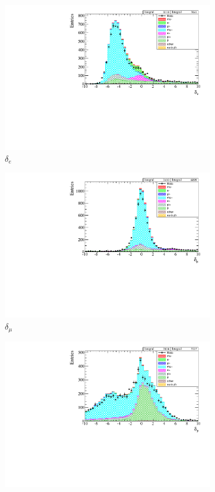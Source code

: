 \begin{figure}[h]
	\begin{subfigure}[t]{0.32\textwidth}
		\includegraphics[width=\textwidth]{figures/numu/Cuts/numubar/presel_pullele_part}
		\caption{$\delta_e$}
	\end{subfigure}
	\begin{subfigure}[t]{0.32\textwidth}
		\includegraphics[width=\textwidth]{figures/numu/Cuts/numubar/presel_pullmu_part}
		\caption{$\delta_\mu$}
	\end{subfigure}
	\begin{subfigure}[t]{0.32\textwidth}
		\includegraphics[width=\textwidth]{figures/numu/Cuts/numubar/presel_pullp_part}

\end{subfigure}
\end{figure}
